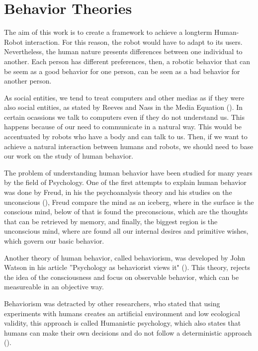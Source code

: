 \section{Behavior Theories}

The aim of this work is to create a framework to achieve a longterm Human-Robot interaction. For this reason, the robot would have to adapt to its users. Nevertheless, the human nature presents differences between one individual to another. Each person has different preferences, then, a robotic behavior that can be seem as a good behavior for one person, can be seen as a bad behavior for another person. 

As social entities, we tend to treat computers and other medias as if they were also social entities, as stated by Reeves and Nass in the Media Equation (\cite{reeves1997media}). In certain ocassions we talk to computers even if they do not understand us. This happens because of our need to communicate in a natural way. This would be accentuated by robots who have a body and can talk to us. Then, if we want to achieve a natural interaction between humans and robots, we should need to base our work on the study of human behavior.

The problem of understanding human behavior have been studied for many years by the field of Psychology. One of the first attempts to explain human behavior was done by Freud, in his the psychoanalysis theory and his studies on the unconscious (\cite{freud1915unconscious}), Freud compare the mind as an iceberg, where in the surface is the conscious mind, below of that is found the preconscious, which are the thoughts that can be retrieved by memory, and finally, the biggest region is the unconscious mind, where are found all our internal desires and primitive wishes, which govern our basic behavior.

Another theory of human behavior, called behaviorism, was developed by John Watson in his article ''Psychology as behaviorist views it" (\cite{watson1913psychology}). This theory, rejects the idea of the consciousness and focus on observable behavior, which can be measureable in an objective way.

Behaviorism was detracted by other researchers, who stated that using experiments with humans creates an artificial environment and low ecological validity, this approach is called Humanistic psychology, which also states that humans can make their own decisions and do not follow a deterministic approach (\cite{rogers1963toward}). 

